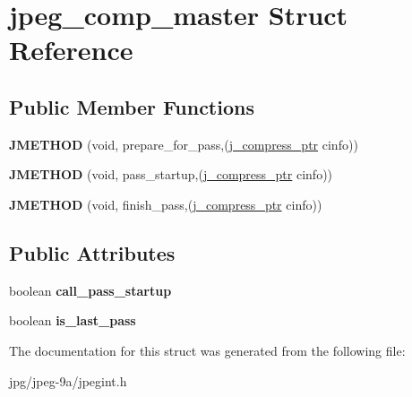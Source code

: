\hypertarget{structjpeg__comp__master}{\section{jpeg\+\_\+comp\+\_\+master Struct Reference}
\label{structjpeg__comp__master}
}
\subsection*{Public Member Functions}
\begin{DoxyCompactItemize}
\item 
\hypertarget{structjpeg__comp__master_afdbee5aedaedd9c6c9837b6bfd834a63}{{\bfseries J\+M\+E\+T\+H\+O\+D} (void, prepare\+\_\+for\+\_\+pass,(\hyperlink{structjpeg__compress__struct}{j\+\_\+compress\+\_\+ptr} cinfo))}\label{structjpeg__comp__master_afdbee5aedaedd9c6c9837b6bfd834a63}

\item 
\hypertarget{structjpeg__comp__master_ac7e4391d1afe92c685cb4ffea5383d2c}{{\bfseries J\+M\+E\+T\+H\+O\+D} (void, pass\+\_\+startup,(\hyperlink{structjpeg__compress__struct}{j\+\_\+compress\+\_\+ptr} cinfo))}\label{structjpeg__comp__master_ac7e4391d1afe92c685cb4ffea5383d2c}

\item 
\hypertarget{structjpeg__comp__master_a81648a22581acb403aa707a5e56bf993}{{\bfseries J\+M\+E\+T\+H\+O\+D} (void, finish\+\_\+pass,(\hyperlink{structjpeg__compress__struct}{j\+\_\+compress\+\_\+ptr} cinfo))}\label{structjpeg__comp__master_a81648a22581acb403aa707a5e56bf993}

\end{DoxyCompactItemize}
\subsection*{Public Attributes}
\begin{DoxyCompactItemize}
\item 
\hypertarget{structjpeg__comp__master_a72c70556604030b6b10d798f6c193e6f}{boolean {\bfseries call\+\_\+pass\+\_\+startup}}\label{structjpeg__comp__master_a72c70556604030b6b10d798f6c193e6f}

\item 
\hypertarget{structjpeg__comp__master_aac35b3d9e718376d1aacdde9df32e75d}{boolean {\bfseries is\+\_\+last\+\_\+pass}}\label{structjpeg__comp__master_aac35b3d9e718376d1aacdde9df32e75d}

\end{DoxyCompactItemize}


The documentation for this struct was generated from the following file\+:\begin{DoxyCompactItemize}
\item 
jpg/jpeg-\/9a/jpegint.\+h\end{DoxyCompactItemize}
